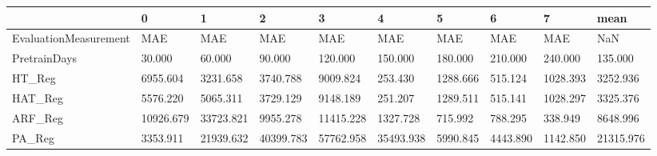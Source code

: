 \begin{tabular}{llllllllll}
\toprule
{} &         0 &         1 &         2 &         3 &         4 &        5 &        6 &        7 &      mean \\
\midrule
EvaluationMeasurement &       MAE &       MAE &       MAE &       MAE &       MAE &      MAE &      MAE &      MAE &       NaN \\
PretrainDays          &    30.000 &    60.000 &    90.000 &   120.000 &   150.000 &  180.000 &  210.000 &  240.000 &   135.000 \\
HT\_Reg                &  6955.604 &  3231.658 &  3740.788 &  9009.824 &   253.430 & 1288.666 &  515.124 & 1028.393 &  3252.936 \\
HAT\_Reg               &  5576.220 &  5065.311 &  3729.129 &  9148.189 &   251.207 & 1289.511 &  515.141 & 1028.297 &  3325.376 \\
ARF\_Reg               & 10926.679 & 33723.821 &  9955.278 & 11415.228 &  1327.728 &  715.992 &  788.295 &  338.949 &  8648.996 \\
PA\_Reg                &  3353.911 & 21939.632 & 40399.783 & 57762.958 & 35493.938 & 5990.845 & 4443.890 & 1142.850 & 21315.976 \\
\bottomrule
\end{tabular}
